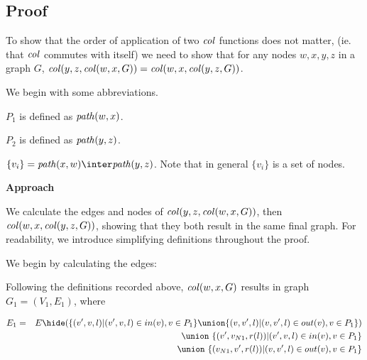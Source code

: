 \subsection{Proof}

To show that  the order of application of two $\mathit{col}$ functions does not matter, (ie. that $\mathit{col}$ commutes with itself)  we need to show that for any nodes $w,x,y,z$ in a graph $G$, $\mathit{col}(y,z,\mathit{col}(w,x,G)) = \mathit{col}(w,x,\mathit{col}(y,z,G))$. 


We begin with some abbreviations.

$P_1$ is defined as $\mathit{path}(w,x)$.

$P_2$ is defined as $\mathit{path}(y,z)$.

$\{v_i\} = \Path(x,w) \inter \Path(y,z)$. Note that in general $\{v_i\}$ is a set of nodes. 









{\bf Approach}

We  calculate the edges and nodes of  $\mathit{col}(y,z,\mathit{col}(w,x,G))$,  then $\mathit{col}(w,x,\mathit{col}(y,z,G))$, showing that they both result in the same final graph. For readability, we introduce simplifying definitions throughout the proof. 


We begin by calculating the edges:

Following the definitions recorded above, $\mathit{col}(w,x,G)$ results in graph $G_1=(V_1,E_1)$, where

\begin{eqnarray*}
  E_1 & = & E\hide (
                   \{(v',v,l)|(v',v,l) \in in(v), v\in P_1\}
                   \union
                   \{(v,v',l)|(v,v',l) \in out(v), v\in P_1\}
                  )\\
  && \union\ \{(v',v_{N1},r(l))|(v',v,l) \in in(v), v\in P_1\}\\
  && \union\ \{(v_{N1},v',r(l))|(v,v',l) \in out(v), v\in P_1\}\\
\end{eqnarray*}

